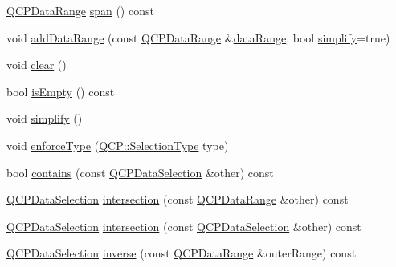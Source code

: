 \begin{DoxyCompactItemize}
\item 
\hyperlink{class_q_c_p_data_range}{Q\+C\+P\+Data\+Range} \hyperlink{class_q_c_p_data_selection_a890f9291e0b7f065747040de5d68ff7d}{span} () const
\item 
void \hyperlink{class_q_c_p_data_selection_a46740c5aa7b80ae9b2abf6985d61b74f}{add\+Data\+Range} (const \hyperlink{class_q_c_p_data_range}{Q\+C\+P\+Data\+Range} \&\hyperlink{class_q_c_p_data_selection_a6956acf6a9a49a353b4f9b58608978ad}{data\+Range}, bool \hyperlink{class_q_c_p_data_selection_a4a2fbad1a6e4d1dd26fdfdf88956f2a4}{simplify}=true)
\item 
void \hyperlink{class_q_c_p_data_selection_a385dd665e6690d39afb8bbd727b1e00b}{clear} ()
\item 
bool \hyperlink{class_q_c_p_data_selection_a7f7526b475998dc0c3d6c376b24736c9}{is\+Empty} () const
\item 
void \hyperlink{class_q_c_p_data_selection_a4a2fbad1a6e4d1dd26fdfdf88956f2a4}{simplify} ()
\item 
void \hyperlink{class_q_c_p_data_selection_a17b84d852911531d229f4a76aa239a75}{enforce\+Type} (\hyperlink{namespace_q_c_p_ac6cb9db26a564b27feda362a438db038}{Q\+C\+P\+::\+Selection\+Type} type)
\item 
bool \hyperlink{class_q_c_p_data_selection_ab1ad3d5bbb55749c3f7ab1e45429c932}{contains} (const \hyperlink{class_q_c_p_data_selection}{Q\+C\+P\+Data\+Selection} \&other) const
\item 
\hyperlink{class_q_c_p_data_selection}{Q\+C\+P\+Data\+Selection} \hyperlink{class_q_c_p_data_selection_af5267ced53687561367105ee77b874ab}{intersection} (const \hyperlink{class_q_c_p_data_range}{Q\+C\+P\+Data\+Range} \&other) const
\item 
\hyperlink{class_q_c_p_data_selection}{Q\+C\+P\+Data\+Selection} \hyperlink{class_q_c_p_data_selection_af296ec5a948656c1d1ecb7b2970d2a24}{intersection} (const \hyperlink{class_q_c_p_data_selection}{Q\+C\+P\+Data\+Selection} \&other) const
\item 
\hyperlink{class_q_c_p_data_selection}{Q\+C\+P\+Data\+Selection} \hyperlink{class_q_c_p_data_selection_ae8097f4e4ffee7b1b5df27c93eb365db}{inverse} (const \hyperlink{class_q_c_p_data_range}{Q\+C\+P\+Data\+Range} \&outer\+Range) const
\end{DoxyCompactItemize}
